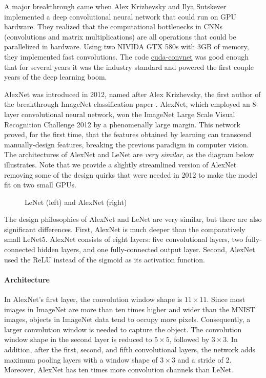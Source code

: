 A major breakthrough came when Alex Krizhevsky and Ilya Sutskever implemented a deep convolutional neural network that could run on GPU hardware. They realized that the computational bottlenecks in CNNs (convolutions and matrix multiplications) are all operations that could be parallelized in hardware. Using two NIVIDA GTX 580s with 3GB of memory, they implemented fast convolutions. The code \href{https://code.google.com/archive/p/cuda-convnet/}{cuda-convnet} was good enough that for several years it was the industry standard and powered the first couple years of the deep learning boom.


AlexNet was introduced in 2012, named after Alex Krizhevsky, the first author of the breakthrough ImageNet classification paper \citep{Krizhevsky2012}. AlexNet, which employed an 8-layer convolutional neural network, won the ImageNet Large Scale Visual Recognition Challenge 2012 by a phenomenally large margin. This network proved, for the first time, that the features obtained by learning can transcend manually-design features, breaking the previous paradigm in computer vision. The architectures of AlexNet and LeNet are \textit{very similar}, as the diagram below illustrates. Note that we provide a slightly streamlined version of AlexNet removing some of the design quirks that were needed in 2012 to make the model fit on two small GPUs.

\begin{figure}[hpt]
	\centering
	
	\caption{LeNet (left) and AlexNet (right)}
	\label{fig:alexnet}
\end{figure}

The design philosophies of AlexNet and LeNet are very similar, but there are also significant differences. First, AlexNet is much deeper than the comparatively small LeNet5. AlexNet consists of eight layers: five convolutional layers, two fully-connected hidden layers, and one fully-connected output layer. Second, AlexNet used the ReLU instead of the sigmoid as its activation function.

\paragraph{Architecture}

In AlexNet's first layer, the convolution window shape is $11\times11$. Since most images in ImageNet are more than ten times higher and wider than the MNIST images, objects in ImageNet data tend to occupy more pixels. Consequently, a larger convolution window is needed to capture the object. The convolution window shape in the second layer is reduced to $5\times5$, followed by $3\times3$. In addition, after the first, second, and fifth convolutional layers, the network adds maximum pooling layers with a window shape of $3\times3$ and a stride of 2. Moreover, AlexNet has ten times more convolution channels than LeNet.

